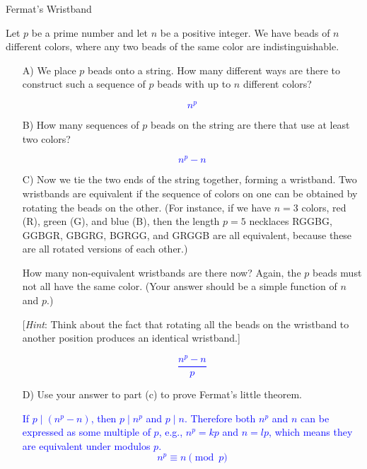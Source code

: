 \begin{homeworkProblem}{Fermat's Wristband}

Let $p$ be a prime number and let $n$ be a positive integer. We have 
beads of $n$ different colors, where any two beads of the same color 
are indistinguishable.

\begin{itemize}
    \item[A)]
    We place $p$ beads onto a string. How many different ways are there 
    to construct such a sequence of $p$ beads with up to $n$ different 
    colors?

    \textcolor{blue}{\[ n^p \]}

    \item[B)] 
    How many sequences of $p$ beads on the string are there that use at 
    least two colors?

    \textcolor{blue}{\[ n^p-n \]}

    \item[C)]
    Now we tie the two ends of the string together, forming a wristband. 
    Two wristbands are equivalent if the sequence of colors on one can 
    be obtained by rotating the beads on the other. (For instance, if we 
    have $n=3$ colors, red (R), green (G), and blue (B), then the length 
    $p = 5$ necklaces RGGBG, GGBGR, GBGRG, BGRGG, and GRGGB are all 
    equivalent, because these are all rotated versions of each other.)

    How many non-equivalent wristbands are there now? Again, the $p$ 
    beads must not all have the same color. (Your answer should be a 
    simple function of $n$ and $p$.)

    [\textit{Hint}: Think about the fact that rotating all the beads on 
    the wristband to another position produces an identical wristband.]

    \textcolor{blue}{\[ \frac{n^{p} - n}{p} \]}

    \item[D)] Use your answer to part (c) to prove Fermat's little 
    theorem.

    \textcolor{blue}{
        If $p \mid (n^p - n)$, then $p \mid n^p$ and $p \mid n$. Therefore
        both $n^p$ and $n$ can be expressed as some multiple of $p$, e.g.,
        $n^p = kp$ and $n = lp$, which means they are equivalent under modulos
        $p$.
        \[
            n^p \equiv n \pmod{p}
        \]    
    }
\end{itemize}

\end{homeworkProblem}
